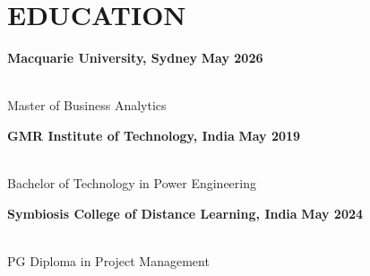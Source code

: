 \documentclass[10pt,a4paper]{article}
\begin{document}
\section{EDUCATION}

\begin{tcolorbox}[
colback=SoftBg,
colframe=SoftLine,
arc=3pt,
boxrule=0.5pt,
left=10pt,
right=10pt,
top=8pt,
bottom=8pt
]

\textbf{\color{Secondary} Macquarie University, Sydney}
\hfill
{\color{Primary}\textbf{May 2026}}

\\
Master of Business Analytics

\vspace{5pt}

\textbf{\color{Secondary} GMR Institute of Technology, India}
\hfill
{\color{Primary}\textbf{May 2019}}

\\
Bachelor of Technology in Power Engineering

\vspace{5pt}

\textbf{\color{Secondary} Symbiosis College of Distance Learning, India}
\hfill
{\color{Primary}\textbf{May 2024}}

\\
PG Diploma in Project Management

\end{tcolorbox}
\end{document}
